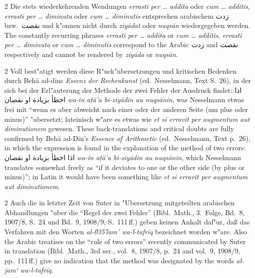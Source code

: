 \documentclass[10pt,a4paper]{article}
\renewcommand{\switchcolumn}{\syncronize\nointerlineskip\columnbreak}
\newcommand{\RL}[1]{\beginR#1\endR}
\newcommand{\ar}[1]{{\arabicfont\RL{#1}}}
\newcommand{\enquote}[1]{``#1''}
\begin{document}
\begin{paracol}{2}
Die stets wiederkehrenden Wendungen \textit{errasti per \ldots{} addita} oder \textit{cum \ldots{} additis}, \textit{errasti per \ldots{} diminuta} oder \textit{cum \ldots{} diminutis} entsprechen arabischem \ar{زدت} bzw.\ \ar{نقصت} und k"onnen nicht durch \textit{ziy\=adat} oder \textit{nuqs\=an} wiedergegeben werden.
\switchcolumn
The constantly recurring phrases \textit{errasti per \ldots{} addita} or \textit{cum \ldots{} additis}, \textit{errasti per \ldots{} diminuta} or \textit{cum \ldots{} diminutis} correspond to the Arabic \ar{زدت} and \ar{نقصت} respectively and cannot be rendered by \textit{ziy\=ada} or \textit{nuqs\=an}.
\end{paracol}

\begin{paracol}{2}
Voll best"atigt werden diese R"uck"ubersetzungen und kritischen Bedenken durch Beh\=a{} ad-d\={i}ns \textit{Essenz der Rechenkunst} (ed.\ Nesselmann, Text S.\ 26), in der sich bei der Erl"auterung der Methode der zwei Fehler der Ausdruck findet: \ar{اذا اخطأ بزيادة او نقصان} \textit{wa-in a\d{t}\=a'a bi-ziy\=adin au nuqs\=anin}, was Nesselmann etwas frei mit \enquote{wenn es aber abweicht nach einer oder der anderen Seite (um plus oder minus)} "ubersetzt; lateinisch w"are es etwas wie \textit{et si erravit per augmentum aut diminutionem} gewesen.
\switchcolumn
These back-translations and critical doubts are fully confirmed by Beh\=a{} ad-D\={i}n's \textit{Essence of Arithmetic} (ed.\ Nesselmann, Text p.\ 26), in which the expression is found in the explanation of the method of two errors: \ar{اذا اخطأ بزيادة او نقصان} \textit{wa-in a\d{t}\=a'a bi-ziy\=adin au nuqs\=anin}, which Nesselmann translates somewhat freely as ``if it deviates to one or the other side (by plus or minus)''; in Latin it would have been something like \textit{et si erravit per augmentum aut diminutionem}.
\end{paracol}

\begin{paracol}{2}
Auch die in letzter Zeit von Suter in "Ubersetzung mitgeteilten arabischen Abhandlungen "uber die \enquote{Regel der zwei Fehler} (Bibl.\ Math., 3.\ Folge, Bd.\ 8, 1907/8, S.\ 24 und Bd.\ 9, 1908/9, S.\ 111\,ff.) geben keinen Anhalt daf"ur, da\ss{} das Verfahren mit den Worten \textit{al-\u0357{}am' wa-l-tafr\={i}q} bezeichnet worden w"are.
\switchcolumn
Also the Arabic treatises on the ``rule of two errors'' recently communicated by Suter in translation (Bibl.\ Math., 3rd ser., vol.\ 8, 1907/8, p.\ 24 and vol.\ 9, 1908/9, pp.\ 111\,ff.) give no indication that the method was designated by the words \textit{al-jam` wa-l-tafr\={i}q}.
\end{paracol}
\end{document}
